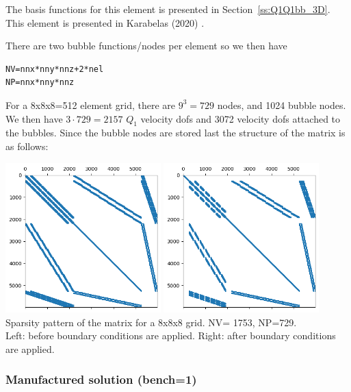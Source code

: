 
The basis functions for this element is presented in Section~\ref{ss:Q1Q1bb_3D}.
This element is presented in Karabelas \etal (2020) \cite{kahp20}. 

There are two bubble functions/nodes per element so we then have 
\begin{lstlisting}
NV=nnx*nny*nnz+2*nel 
NP=nnx*nny*nnz
\end{lstlisting}
For a 8x8x8=512 element grid, there are $9^3=729$ nodes, and 1024 bubble nodes.
We then have $3\cdot 729=2157$ $Q_1$ velocity dofs and 3072 velocity dofs attached 
to the bubbles.
Since the bubble nodes are stored last the structure of the matrix is as follows:
\begin{center}
\includegraphics[width=6cm]{python_codes/fieldstone_82/results/matrix_8x8x8_bef_bc}
\includegraphics[width=6cm]{python_codes/fieldstone_82/results/matrix_8x8x8_aft_bc}\\
{\captionfont Sparsity pattern of the matrix for a 8x8x8 grid.
NV= 1753, NP=729.\\ Left:
before boundary conditions are applied. 
Right: after boundary conditions are applied.} 
\end{center}


\subsubsection*{Manufactured solution (bench=1)}

